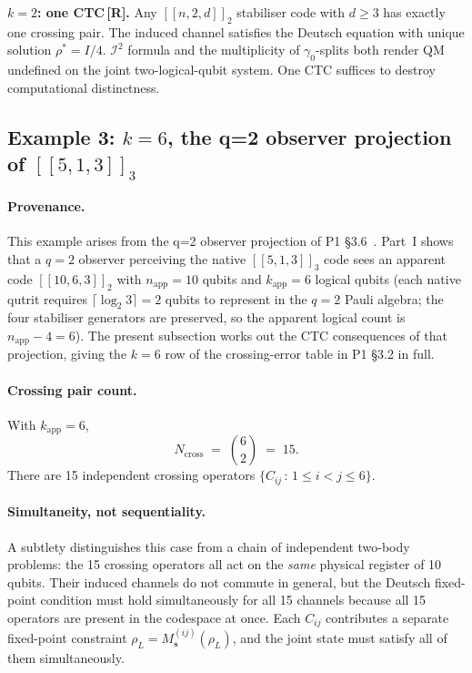 \documentclass[11pt,a4paper]{article}
\newcommand{\Rmark}{\textcolor{green!50!black}{\textbf{[R]}}}
\newcommand{\Cq}[4]{[\![#1,#2,#3]\!]_{#4}}
\newcommand{\Ms}{M_{\mathbf{s}}}
\newcommand{\nApp}{n_{\mathrm{app}}}
\newcommand{\kApp}{k_{\mathrm{app}}}
\begin{document}
\begin{mdframed}[backgroundcolor=Rbg,linecolor=Rcolor,linewidth=1.5pt]
\textbf{$k=2$: one CTC\,\Rmark.}\quad
Any $[\![n,2,d]\!]_2$ stabiliser code with $d\geq3$ has exactly one crossing pair. The induced channel satisfies the Deutsch equation with unique solution $\rho^*=I/4$. $\mathcal{I}^2$ formula and the multiplicity of $\gamma_0$-splits both render QM undefined on the joint two-logical-qubit system. One CTC suffices to destroy computational distinctness.
\end{mdframed}

\subsection{Example 3: $k=6$, the q=2 observer projection of $\Cq{5}{1}{3}{3}$}
\label{sec:ex_k6}

\paragraph{Provenance.}
This example arises from the q=2 observer projection of P1 \S3.6~\cite{Hubka2026QSD}. Part~I shows that a $q=2$ observer perceiving the native $\Cq{5}{1}{3}{3}$ code sees an apparent code $\Cq{10}{6}{3}{2}$ with $\nApp=10$ qubits and $\kApp=6$ logical qubits (each native qutrit requires $\lceil\log_2 3\rceil=2$ qubits to represent in the $q=2$ Pauli algebra; the four stabiliser generators are preserved, so the apparent logical count is $\nApp-4=6$). The present subsection works out the CTC consequences of that projection, giving the $k=6$ row of the crossing-error table in P1 \S3.2 in full.

\paragraph{Crossing pair count.}
With $\kApp=6$,
\begin{equation}
  N_{\mathrm{cross}} \;=\; \binom{6}{2} \;=\; 15.
  \label{eq:cross_k6}
\end{equation}
There are 15 independent crossing operators
\(
  \{C_{ij}\,:\,1\leq i<j\leq 6\}.
\)

\paragraph{Simultaneity, not sequentiality.}
A subtlety distinguishes this case from a chain of independent two-body problems: the 15 crossing operators all act on the \emph{same} physical register of 10 qubits. Their induced channels do not commute in general, but the Deutsch fixed-point condition must hold simultaneously for all 15 channels because all 15 operators are present in the codespace at once. Each $C_{ij}$ contributes a separate fixed-point constraint $\rho_L = \Ms^{(ij)}(\rho_L)$, and the joint state must satisfy all of them simultaneously.
\end{document}
